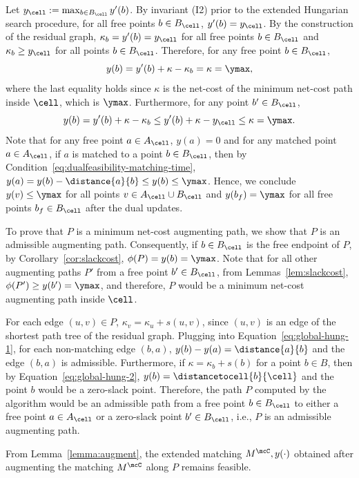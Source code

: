     


 Let $y_{\cell}:=\max_{b\in B_\cell}y'(b)$. By invariant (I2) prior to the extended Hungarian search procedure, for all free points $b\in B_\cell$, $y'(b)=y_{\cell}$. By the construction of the residual graph, $\kappa_b=y'(b)=y_\cell$ for all free points $b\in B_\cell$ and $\kappa_b\ge y_\cell$ for all points $b\in B_\cell$. Therefore, for any free point $b\in B_\cell$, 
\[y(b) = y'(b)+\kappa-\kappa_{b} = \kappa=\ymax,\]
where the last equality holds since $\kappa$ is the net-cost of the minimum net-cost path inside $\cell$, which is $\ymax$.
Furthermore, for any point $b'\in B_\cell$,
\[y(b) = y'(b)+\kappa-\kappa_{b} \le y'(b)+\kappa-y_\cell \le \kappa=\ymax.\]
Note that for any free point $a\in A_\cell$, $y(a)=0$ and for any matched point $a\in A_\cell$, if $a$ is matched to a point $b\in B_\cell$, then by Condition~\eqref{eq:dualfeasibility-matching-time}, $y(a)=y(b)-\distance{a}{b}\le y(b)\le \ymax$. 
Hence, we conclude $y(v)\le \ymax$ for all points $v\in A_\cell\cup B_\cell$ and $y(b_f)=\ymax$ for all free points $b_f\in B_\cell$ after the dual updates. 



 To prove that $P$ is a minimum net-cost augmenting path, we show that $P$ is an admissible augmenting path. Consequently, if $b\in B_\cell$ is the free endpoint of $P$, by Corollary~\ref{cor:slackcost}, $\phi(P)=y(b)=\ymax$. Note that for all other augmenting paths $P'$ from a free point $b'\in B_\cell$, from Lemmas~\ref{lem:slackcost}, $\phi(P')\ge y(b')=\ymax$, and therefore, $P$ would be a minimum net-cost augmenting path inside $\cell$.

For each edge $(u,v)\in P$, $\kappa_v = \kappa_u + s(u,v)$, since $(u,v)$ is an edge of the shortest path tree of the residual graph. Plugging into Equation~\eqref{eq:global-hung-1}, for each non-matching edge $(b,a)$, $y(b)-y(a)=\distance{a}{b}$ and the edge $(b,a)$ is admissible. Furthermore, if $\kappa=\kappa_b+s(b)$ for a point $b\in B$, then by Equation~\eqref{eq:global-hung-2}, $y(b)=\distancetocell{b}{\cell}$ and the point $b$ would be a zero-slack point. Therefore, the path $P$ computed by the algorithm would be an admissible path from a free point $b\in B_\cell$ to either a free point $a\in A_\cell$ or a zero-slack point $b'\in B_\cell$, i.e., $P$ is an admissible augmenting path. 

From Lemma~\ref{lemma:augment}, the extended matching $M^\mcC, y(\cdot)$ obtained after augmenting the matching $M^\mcC$ along $P$ remains feasible.

